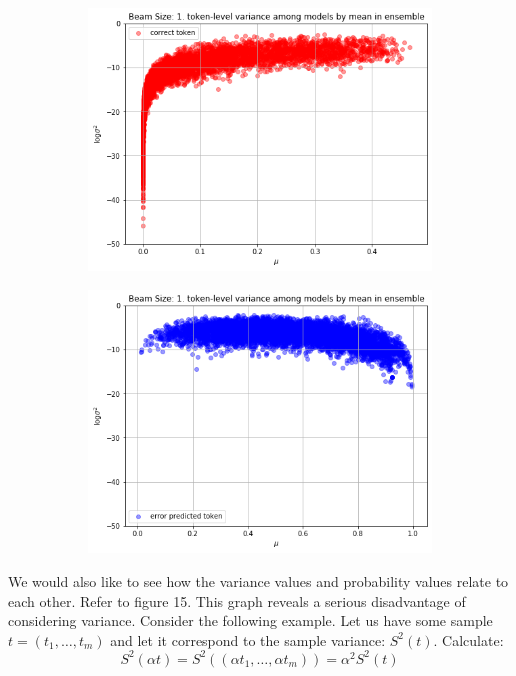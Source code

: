 \documentclass[a4paper,14pt]{extarticle}
\begin{document}
	\begin{figure}[t]
		\begin{subfigure}{.5\textwidth}
			\includegraphics[width=\textwidth]{images/inens_scatter_correct.png}
		\end{subfigure}
		\begin{subfigure}{.5\textwidth}
			\includegraphics[width=\textwidth]{images/inens_scatter_error.png}
		\end{subfigure}
	\end{figure}
	We would also like to see how the variance values and probability values relate to each other. Refer to figure 15. This graph reveals a serious disadvantage of considering variance. Consider the following example. Let us have some sample $t = (t_1, \dots, t_m)$ and let it correspond to the sample variance: $S^2 (t)$. Calculate:
	\begin{equation*}
		S^2(\alpha t) = S^2((\alpha t_1, \dots, \alpha t_m)) = \alpha^2 S^2(t)
	\end{equation*}
	
\end{document}
